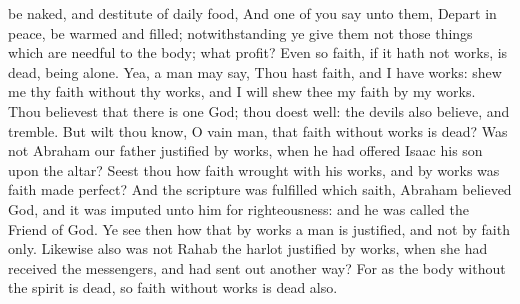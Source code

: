{be
naked,
and
destitute of
daily
food,
And
one
of
you
say unto
them,
Depart
in
peace,
be
{}
warmed
and
filled;
notwithstanding ye
give
them
not those things which are
needful to the
body;
what
{}
profit?
Even
so
faith,
if it
hath
not
works,
is
dead,
being
alone.
Yea, a
man may
say,
Thou
hast
faith, and
I
have
works:
shew
me
thy
faith
without
thy
works, and
I will
shew
thee
my
faith
by
my
works.
Thou
believest
that there
is
one
God; thou
doest
well: the
devils
also
believe,
and
tremble.
But wilt
thou
know,
O
vain
man,
that
faith
without
works
is
dead?
Was
not
Abraham
our
father
justified
by
works, when he had
offered
Isaac
his
son
upon the
altar?
Seest
thou
how
faith wrought
with
his
works,
and
by
works
was
faith made
perfect?
And the
scripture was
fulfilled which
saith,
Abraham
believed
God,
and it was
imputed unto
him
for
righteousness:
and he was
called the
Friend of
God.
Ye
see
then how
that
by
works a
man is
justified,
and
not
by
faith
only.
Likewise
also
was
not
Rahab the
harlot
justified
by
works, when she had
received the
messengers,
and had
sent
{}
out
another
way?
For
as the
body
without the
spirit
is
dead,
so
faith
without
works
is
dead
also.

}
